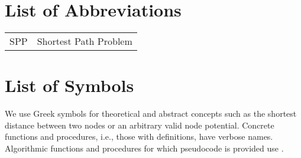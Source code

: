

\appendix

{}	%
{}	%

\section{List of Abbreviations}
\label{app:abb}

\begin{tabular}{cp{}}
	SPP & Shortest Path Problem \\
\end{tabular}



\section{List of Symbols}
\label{app:symbols}

We use Greek symbols for theoretical and abstract concepts such as the shortest distance between two nodes or an arbitrary valid node potential. Concrete functions and procedures, i.e., those with definitions, have verbose names. Algorithmic functions and procedures for which pseudocode is provided use .

